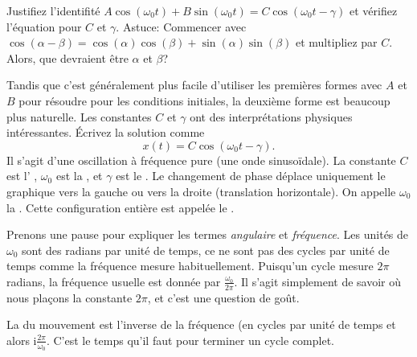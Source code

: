 \begin{exercise}
Justifiez l'identifité  
	$A \cos (\omega_0 t) + B \sin (\omega_0 t) = C \cos ( \omega_0 t - \gamma )$ 
	et vérifiez l'équation pour $C$ et $\gamma$.  
	Astuce: Commencer avec  
	$\cos (\alpha-\beta) = \cos (\alpha) \cos (\beta) + \sin (\alpha)\sin (\beta)$ 
	et multipliez par $C$.  Alors, que devraient être $\alpha$ et $\beta$?
\end{exercise}

Tandis que c'est généralement plus facile d'utiliser les premières formes avec  $A$ et $B$
pour résoudre pour les conditions initiales, la deuxième forme est beaucoup plus naturelle. 
Les constantes $C$ et $\gamma$ ont des interprétations physiques intéressantes. 
Écrivez la solution comme
\begin{equation*}
	x(t) = C \cos ( \omega_0 t - \gamma ) .
\end{equation*}
Il s'agit d'une oscillation à fréquence pure (une onde sinusoïdale).
La constante  $C$ est l' \emph{}, $\omega_0$ est la 
\emph{},
et $\gamma$ est le \emph{}.
Le changement de phase déplace uniquement le graphique vers la gauche ou vers la droite (translation horizontale). 
On appelle $\omega_0$ la \emph{}.
Cette configuration entière est
appelée le \emph{}.

Prenons une pause pour expliquer les termes \emph{angulaire} et \emph{fréquence}.
Les unités de $\omega_0$ sont des radians par unité de temps, ce ne sont pas des cycles par unité de temps comme la fréquence mesure habituellement. Puisqu'un cycle mesure $2
\pi$ radians, la fréquence usuelle est donnée par  $\frac{\omega_0}{2\pi}$.
Il s'agit simplement de savoir où nous plaçons la constante $2\pi$, 
et c'est une question de goût.

La \emph{} du mouvement est l'inverse de la fréquence  (en cycles par unité de temps et alors i$\frac{2\pi}{\omega_0}$.  C'est le temps qu'il faut pour terminer un cycle complet.


